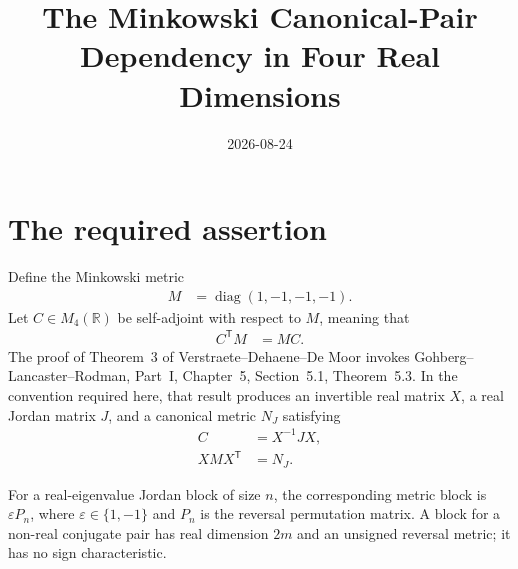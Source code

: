 \documentclass{article}
\title{The Minkowski Canonical-Pair Dependency in Four Real Dimensions}
\author{}
\date{2026-08-24}
\begin{document}
\maketitle
{}

\section{The required assertion}

Define the Minkowski metric
\begin{align}
    M
        &=\operatorname{diag}(1,-1,-1,-1).
    \label{eq:qiclean_minkowski_canonical_pair_dependency_minkowski_metric}
\end{align}
Let $C\in M_4(\mathbb R)$ be self-adjoint with respect to $M$, meaning that
\begin{align}
    C^{\mathsf T}M
        &=MC.
    \label{eq:qiclean_minkowski_canonical_pair_dependency_m_selfadjoint}
\end{align}
The proof of Theorem~3 of Verstraete--Dehaene--De Moor invokes
Gohberg--Lancaster--Rodman, Part~I, Chapter~5, Section~5.1, Theorem~5.3.
In the convention required here, that result produces an invertible real
matrix $X$, a real Jordan matrix $J$, and a canonical metric $N_J$ satisfying
\begin{align}
    C
        &=X^{-1}JX,
    \label{eq:qiclean_minkowski_canonical_pair_dependency_similarity}\\
    XMX^{\mathsf T}
        &=N_J.
    \label{eq:qiclean_minkowski_canonical_pair_dependency_metric_congruence}
\end{align}

For a real-eigenvalue Jordan block of size $n$, the corresponding metric block
is $\varepsilon P_n$, where $\varepsilon\in\{1,-1\}$ and $P_n$ is the reversal
permutation matrix. A block for a non-real conjugate pair has real dimension
$2m$ and an unsigned reversal metric; it has no sign characteristic.
\end{document}
